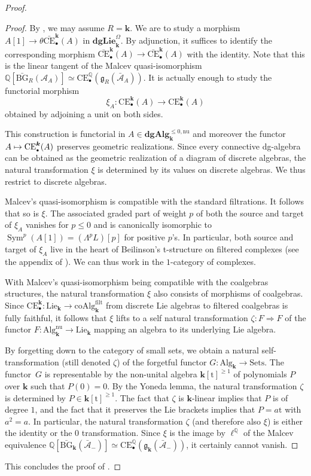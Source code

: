 \documentclass[11pt]{article}
\let\mathcal\mathscr
\let\autoref\Cref
\newcommand\mto{\mathchoice{\longmapsto}{\mapsto}{\mapsto}{\mapsto}}
\let\widebar\bar
\newcommand{\sbullet}{{\scriptscriptstyle\bullet}}
\theoremstyle{definition}
\newcommand{\Q}{\mathbb{Q}}
\newcommand{\Alg}{\mathbf{Alg}}
\newcommand{\dgLie}{\mathbf{dgLie}}
\newcommand{\dgAlg}{\mathbf{dgAlg}}
\DeclareMathOperator{\Sym}{Sym}
\renewcommand{\k}{{\boldsymbol{k}}}
\newcommand{\ellQ}{\operatorname{\ell^\Q}}
\newcommand{\Ac}{\mathcal{A}}
\newcommand{\bAc}{\widebar{\mathcal{A}}}
\newcommand{\bCE}{\widebar{\mathrm{CE}}}
\newcommand{\CE}{\mathrm{CE}}
\newcommand{\g}{\mathfrak{g}}
\newcommand{\bBG}{\widebar{\mathrm{BG}}}
\begin{document}
\begin{proof}
\begin{proof}
By \autoref{rmq:Risk}, we may assume $R = \k$.
\renewcommand{\Alg}{\mathrm{Alg}}
We are to study a morphism $ A[1] \to \theta \bCE^\k_\sbullet(A)$ in $\dgLie^\Omega_\k$.
By adjunction, it suffices to identify the corresponding morphism $\bCE_\sbullet^\k(A) \to \bCE_\sbullet^\k(A)$ with the identity. Note that this is the linear tangent of the Malcev quasi-isomorphism $\Q[\bBG_R(\Ac_A)] \simeq \CE_\sbullet^\Q(\g_R(\bAc_A))$. It is actually enough to study the functorial morphism
\[
\xi_A \colon \CE^\k_\sbullet(A) \to \CE^\k_\sbullet(A)
\]
obtained by adjoining a unit on both sides.

This construction is functorial in $A \in \dgAlg_\k^{\leq 0, \mathrm{nu}}$ and moreover the functor $A \mto \CE_\sbullet^\k(A)$ preserves geometric realizations.
Since every connective dg-algebra can be obtained as the geometric realization of a diagram of discrete algebras, the natural transformation $\xi$ is determined by its values on discrete algebras. We thus restrict to discrete algebras.

Malcev's quasi-isomorphism is compatible with the standard filtrations. It follows that so is $\xi$. The associated graded part of weight $p$ of both the source and target of $\xi_A$ vanishes for $p \leq 0$ and is canonically isomorphic to $\Sym^p(A[1]) = (\Lambda^p L)[p]$ for positive $p$'s. In particular, both source and target of $\xi_A$ live in the heart of Beilinson's t-structure on filtered complexes (see the appendix of \cite{beilinson:perv}). We can thus work in the $1$-category of complexes.

With Malcev's quasi-isomorphism being compatible with the coalgebras structures, the natural transformation $\xi$ also consists of morphisms of coalgebras. Since $\CE^\k_\sbullet \colon \mathrm{Lie}_\k \to \mathrm{coAlg}^\mathrm{filt}_\k$ from discrete Lie algebras to filtered coalgebras is fully faithful, it follows that $\xi$ lifts to a self natural transformation $\zeta \colon F \Rightarrow F$ of the functor $F \colon \mathrm{Alg}_\k^{\mathrm{nu}} \to \mathrm{Lie}_\k$ mapping an algebra to its underlying Lie algebra.

By forgetting down to the category of small sets, we obtain a natural self-trans\-formation (still denoted $\zeta$) of the forgetful functor $G \colon \Alg_\k \to \mathrm{Sets}$. The functor~$G$ is representable by the non-unital algebra $\k[\mathrm{t}]^{\geq 1}$ of polynomials $P$ over $\k$ such that $P(0) = 0$. By the Yoneda lemma, the natural transformation $\zeta$ is determined by $P \in \k[\mathrm{t}]^{\geq 1}$.
The fact that $\zeta$ is $\k$-linear implies that $P$ is of degree $1$, and the fact that it preserves the Lie brackets implies that $P = a\mathrm{t}$ with $a^2 = a$.
In particular, the natural transformation $\zeta$ (and therefore also $\xi$) is either the identity or the $0$ transformation.
Since $\xi$ is the image by $\ellQ$ of the Malcev equivalence $\Q[\bBG_\k(\bAc_-)] \simeq \CE_\sbullet^\Q(\g_\k(\bAc_-))$, it certainly cannot vanish.
\end{proof}

This concludes the proof of \autoref{thm:compLQT}.
\end{proof}
\end{document}
